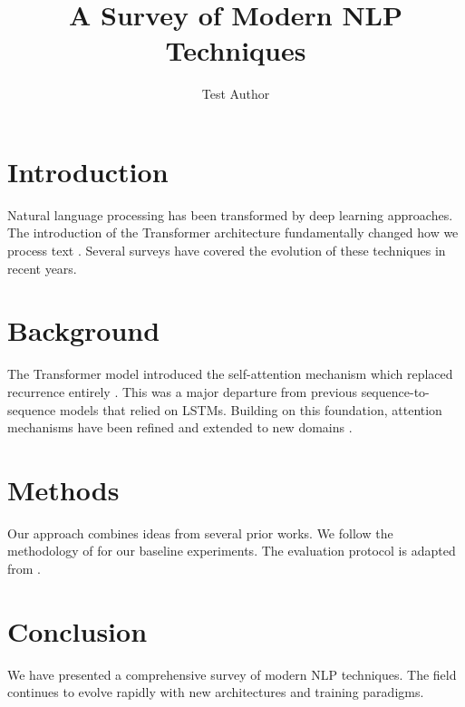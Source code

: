 \documentclass{article}
\title{A Survey of Modern NLP Techniques}
\author{Test Author}
\begin{document}
\maketitle

\section{Introduction}

Natural language processing has been transformed by deep learning approaches.
The introduction of the Transformer architecture fundamentally changed how we process text \cite{smith2020deep}.
Several surveys have covered the evolution of these techniques in recent years.

\section{Background}

The Transformer model introduced the self-attention mechanism which replaced recurrence entirely \citep{jones2019transformers}.
This was a major departure from previous sequence-to-sequence models that relied on LSTMs.
Building on this foundation, attention mechanisms have been refined and extended to new domains \citet{lee2021attention}.

\section{Methods}

Our approach combines ideas from several prior works.
We follow the methodology of \cite{smith2020deep} for our baseline experiments.
The evaluation protocol is adapted from \cite{jones2019transformers}.

\section{Conclusion}

We have presented a comprehensive survey of modern NLP techniques.
The field continues to evolve rapidly with new architectures and training paradigms.



\end{document}
